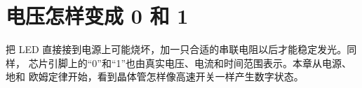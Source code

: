 \chapter{电压怎样变成 0 和 1}

把 LED 直接接到电源上可能烧坏，加一只合适的串联电阻以后才能稳定发光。同样，
芯片引脚上的“0”和“1”也由真实电压、电流和时间范围表示。本章从电源、地和
欧姆定律开始，看到晶体管怎样像高速开关一样产生数字状态。



